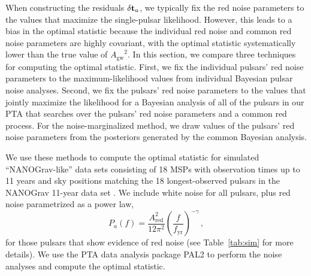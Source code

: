\documentclass[twocolumn,aps,prd,superscriptaddress]{revtex4-1}
\newcommand{\Agw}{\ensuremath{A_\mathrm{gw}}}
\newcommand{\res}{\ensuremath{\delta {\bf t}}}
\begin{document}
When constructing the residuals $\res_a$, 
we typically fix the red noise parameters to the values that 
maximize the single-pulsar likelihood. 
However, this leads to a bias in the optimal statistic 
because the individual red noise and common red noise parameters 
are highly covariant, 
with the optimal statistic systematically lower than the true value of $\Agw^2$. 
In this section, we compare three techniques for computing the optimal statistic. 
First, we fix the individual pulsars' red noise parameters to the 
maximum-likelihood values from individual Bayesian pulsar noise analyses. 
Second, we fix the pulsars' red noise parameters to the 
values that jointly maximize the likelihood for a Bayesian analysis 
of all of the pulsars in our PTA 
that searches over the pulsars' red noise parameters and 
a common red process. 
For the noise-marginalized method, we draw values of the pulsars' 
red noise parameters from the posteriors generated by the common Bayesian analysis.

We use these methods to compute the optimal statistic 
for simulated ``NANOGrav-like'' data sets 
consisting of 18 MSPs with observation times up to 11 years 
and sky positions matching the 18 longest-observed pulsars in the 
NANOGrav 11-year data set \citep{abb+17}. 
We include white noise for all pulsars, plus 
red noise parametrized as a power law, 
\begin{equation}
	P_a(f) = \frac{A_\mathrm{red}^2}{12\pi^2} \left( \frac{f}{f_\mathrm{yr}} \right)^{-\gamma} \,,
\end{equation}
for those pulsars that show evidence of red noise 
(see Table~\ref{tab:sim} for more details).
We use the PTA data analysis package 
PAL2 %
\citep{evh17a}
to perform the noise analyses and compute the optimal statistic.
\end{document}
